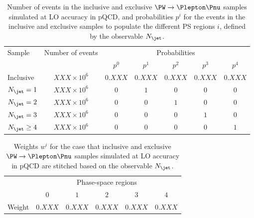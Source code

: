 \begin{table}[h!]
\begin{center}
\begin{tabular}{l|c|ccccc}
\hline
\multirow{2}{20mm}{Sample} & Number of events    & \multicolumn{5}{c}{Probabilities}               \\
                           &                     & $p^{0}$ & $p^{1}$ & $p^{2}$ & $p^{3}$ & $p^{4}$ \\
\hline
\hline
Inclusive                  & $XXX \times 10^{6}$ & $0.XXX$ & $0.XXX$ & $0.XXX$ & $0.XXX$ & $0.XXX$ \\
\hline
$N_{\jet} = 1$             & $XXX \times 10^{6}$ & $0$     & $1$     & $0$     & $0$     & $0$     \\
$N_{\jet} = 2$             & $XXX \times 10^{6}$ & $0$     & $0$     & $1$     & $0$     & $0$     \\
$N_{\jet} = 3$             & $XXX \times 10^{6}$ & $0$     & $0$     & $0$     & $1$     & $0$     \\
$N_{\jet} \geq 4$          & $XXX \times 10^{6}$ & $0$     & $0$     & $0$     & $0$     & $1$     \\
\hline
\end{tabular}
\end{center}
\caption{
  Number of events in the inclusive and exclusive $\PW \to \Plepton\Pnu$ samples simulated at LO accuracy in pQCD,
  and probabilities $p^{i}$ for the events in the inclusive and exclusive samples to populate the different PS regions $i$,
  defined by the observable $N_{\jet}$.
}
\label{tab:samples_and_probabilities_WJets_vs_Njet}
\end{table}

\begin{table}[h!]
\begin{center}
\begin{tabular}{l|ccccc}
\hline
 & \multicolumn{5}{c}{Phase-space regions} \\
 & $0$ & $1$ & $2$ & $3$ & $4$ \\
\hline
\hline
Weight & $0.XXX$ & $0.XXX$ & $0.XXX$ & $0.XXX$ & $0.XXX$ \\
\hline
\end{tabular}
\end{center}
\caption{
  Weights $w^{i}$ for the case that inclusive and exclusive $\PW \to \Plepton\Pnu$ samples simulated at LO accuracy in pQCD
  are stitched based on the observable $N_{\jet}$.
}
\label{tab:weights_WJets_vs_Njet}
\end{table}

